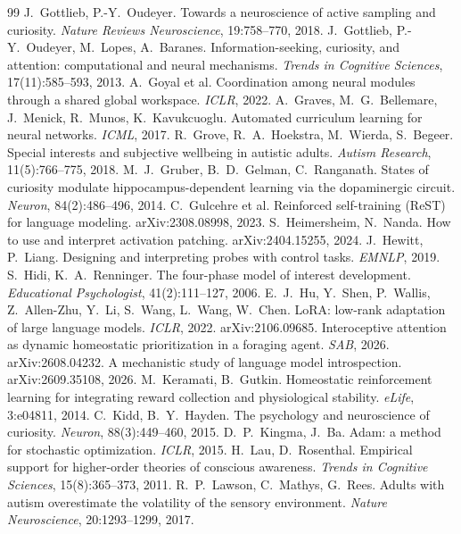 \documentclass[11pt,a4paper]{article}
\begin{document}
\begin{thebibliography}{99}
 J.~Gottlieb, P.-Y.~Oudeyer. Towards a neuroscience of active sampling and curiosity. \emph{Nature Reviews Neuroscience}, 19:758--770, 2018.
 J.~Gottlieb, P.-Y.~Oudeyer, M.~Lopes, A.~Baranes. Information-seeking, curiosity, and attention: computational and neural mechanisms. \emph{Trends in Cognitive Sciences}, 17(11):585--593, 2013.
 A.~Goyal et al. Coordination among neural modules through a shared global workspace. \emph{ICLR}, 2022.
 A.~Graves, M.~G.~Bellemare, J.~Menick, R.~Munos, K.~Kavukcuoglu. Automated curriculum learning for neural networks. \emph{ICML}, 2017.
 R.~Grove, R.~A.~Hoekstra, M.~Wierda, S.~Begeer. Special interests and subjective wellbeing in autistic adults. \emph{Autism Research}, 11(5):766--775, 2018.
 M.~J.~Gruber, B.~D.~Gelman, C.~Ranganath. States of curiosity modulate hippocampus-dependent learning via the dopaminergic circuit. \emph{Neuron}, 84(2):486--496, 2014.
 C.~Gulcehre et al. Reinforced self-training (ReST) for language modeling. arXiv:2308.08998, 2023.
 S.~Heimersheim, N.~Nanda. How to use and interpret activation patching. arXiv:2404.15255, 2024.
 J.~Hewitt, P.~Liang. Designing and interpreting probes with control tasks. \emph{EMNLP}, 2019.
 S.~Hidi, K.~A.~Renninger. The four-phase model of interest development. \emph{Educational Psychologist}, 41(2):111--127, 2006.
 E.~J.~Hu, Y.~Shen, P.~Wallis, Z.~Allen-Zhu, Y.~Li, S.~Wang, L.~Wang, W.~Chen. LoRA: low-rank adaptation of large language models. \emph{ICLR}, 2022. arXiv:2106.09685.
 Interoceptive attention as dynamic homeostatic prioritization in a foraging agent. \emph{SAB}, 2026. arXiv:2608.04232.
 A mechanistic study of language model introspection. arXiv:2609.35108, 2026.
 M.~Keramati, B.~Gutkin. Homeostatic reinforcement learning for integrating reward collection and physiological stability. \emph{eLife}, 3:e04811, 2014.
 C.~Kidd, B.~Y.~Hayden. The psychology and neuroscience of curiosity. \emph{Neuron}, 88(3):449--460, 2015.
 D.~P.~Kingma, J.~Ba. Adam: a method for stochastic optimization. \emph{ICLR}, 2015.
 H.~Lau, D.~Rosenthal. Empirical support for higher-order theories of conscious awareness. \emph{Trends in Cognitive Sciences}, 15(8):365--373, 2011.
 R.~P.~Lawson, C.~Mathys, G.~Rees. Adults with autism overestimate the volatility of the sensory environment. \emph{Nature Neuroscience}, 20:1293--1299, 2017.

\end{thebibliography}
\end{document}
